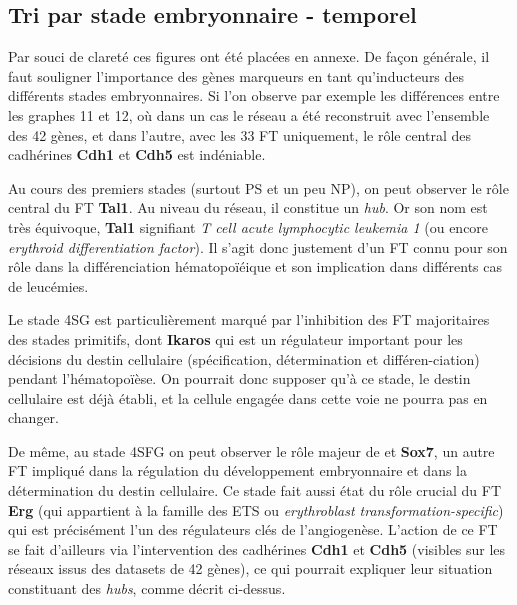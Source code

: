 \documentclass[fleqn,11pt]{SelfArx} %
\begin{document}
\subsection{Tri par stade embryonnaire -  temporel}
Par souci de clareté ces figures ont été placées en annexe. De façon générale, il faut souligner l'importance des gènes marqueurs en tant qu'inducteurs des différents stades embryonnaires. Si l'on observe par exemple les différences entre les graphes 11 et 12, où dans un cas le réseau a été reconstruit avec l'ensemble des 42 gènes, et dans l'autre, avec les 33 FT uniquement, le rôle central des cadhérines \textbf{Cdh1} et \textbf{Cdh5} est indéniable. 
\par Au cours des premiers stades (surtout PS et un peu NP), on peut observer le rôle central du FT \textbf{Tal1}. Au niveau du réseau, il constitue un \textit{hub}. Or son nom est très équivoque, \textbf{Tal1} signifiant \textit{T cell acute lymphocytic leukemia 1} (ou encore \textit{erythroid differentiation factor}). Il s'agit donc justement d'un FT connu pour son rôle dans la différenciation hématopoïéique et son implication dans différents cas de leucémies.
\par Le stade 4SG est particulièrement marqué par l'inhibition des FT majoritaires des stades primitifs, dont \textbf{Ikaros} qui est un régulateur important pour les décisions du destin cellulaire (spécification, détermination et différen-ciation) pendant l'hématopoïèse. On pourrait donc supposer qu'à ce stade, le destin cellulaire est déjà établi, et la cellule engagée dans cette voie ne pourra pas en changer. 
\par De même, au stade 4SFG on peut observer le rôle majeur de  et \textbf{Sox7}, un autre FT impliqué dans la régulation du développement embryonnaire et dans la détermination du destin cellulaire. Ce stade fait aussi état du rôle crucial du FT \textbf{Erg} (qui appartient à la famille des ETS ou \textit{erythroblast transformation-specific}) qui est précisément l'un des régulateurs clés de l'angiogenèse. L'action de ce FT se fait d'ailleurs via l'intervention des cadhérines \textbf{Cdh1} et \textbf{Cdh5} (visibles sur les réseaux issus des datasets de 42 gènes), ce qui pourrait expliquer leur situation constituant des \textit{hubs}, comme décrit ci-dessus\cite{Erg}.


\end{document}
